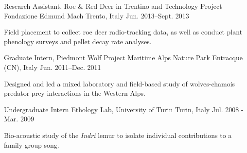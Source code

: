 \begin{cventries}
  \cventry
    {Research Assistant, Roe \& Red Deer in Trentino and Technology Project} %
    {Fondazione Edmund Mach} %
    {Trento, Italy} %
    {Jun. 2013--Sept. 2013} %
    {
      \begin{cvitems} %
        \item {Field placement to collect roe deer radio-tracking data, as well as conduct plant phenology surveys and pellet decay rate analyses.}
      \end{cvitems}   
    }

  \cventry
    {Graduate Intern, Piedmont Wolf Project} %
    {Maritime Alps Nature Park} %
    {Entracque (CN), Italy} %
    {Jun. 2011--Dec. 2011} %
    {
      \begin{cvitems} %
        \item {Designed and led a mixed laboratory and field-based study of wolves-chamois predator-prey interactions in the Western Alps.}
      \end{cvitems} 
    }

  \cventry
    {Undergraduate Intern} %
    {Ethology Lab, University of Turin} %
    {Turin, Italy} %
    {Jul. 2008 - Mar. 2009} %
    {
       \begin{cvitems} %
        \item {Bio-acoustic study of the \textit{Indri} lemur to isolate individual contributions to a family group song.}
      \end{cvitems} 
    }

\end{cventries}
